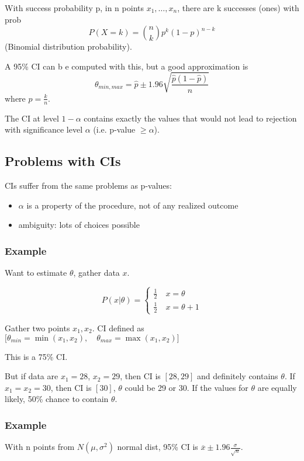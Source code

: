 \documentclass[12pt,a4paper,oneside,fleqn]{article}
\begin{document}
With success probability p, in n points $x_1,\ldots,x_n$, there are k successes (ones) with prob \[
  P (X = k) = \binom{n}{k} p^k (1-p)^{n-k}
\] (Binomial distribution probability).

A 95\% CI can b e computed with this, but a good approximation is \[
  \theta_{min,max} = \hat{p} \pm 1.96 \sqrt{\frac{\hat{p}(1-\hat{p})}{n}}
\] where $\hat{p} = \frac{k}{n}$.

The CI at level $1-\alpha$ contains exactly the values that would not lead to rejection with significance level $\alpha$ (i.e. p-value $\geq \alpha$).

\subsection{Problems with CIs}
CIs suffer from the same problems as p-values:

\begin{itemize}
  \item $\alpha$ is a property of the procedure, not of any realized outcome
  \item ambiguity: lots of choices possible
\end{itemize}

\subsubsection{Example}
Want to estimate $\theta$, gather data $x$.

\[
  P(x | \theta) = \begin{cases} \frac{1}{2} \quad x = \theta \\ \frac{1}{2} \quad x = \theta+1 \end{cases}
\]

Gather two points $x_1, x_2$. CI defined as $\big[ \theta_{min} = \min(x_1, x_2), \quad \theta_{max} = \max(x_1, x_2) \big]$

This is a 75\% CI.

But if data are $x_1 = 28$, $x_2 = 29$, then CI is $[28, 29]$ and definitely contains $\theta$.
If $x_1 = x_2 = 30$, then CI is $[30]$, $\theta$ could be 29 or 30.
If the values for $\theta$ are equally likely, 50\% chance to contain $\theta$.

\subsubsection{Example}
With n points from $N(\mu, \sigma^2)$ normal dist, 95\% CI is $\overline{x} \pm 1.96 \frac{\sigma}{\sqrt{n}}$.
\end{document}
